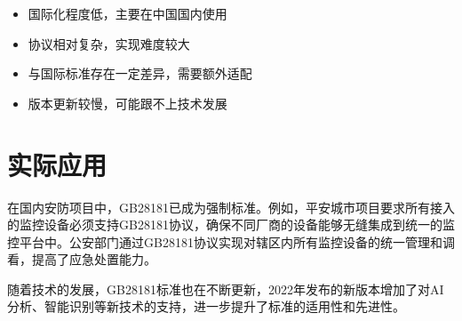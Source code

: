 \documentclass[12pt,UTF8]{ctexbook}
\begin{document}
\begin{itemize}
  \item 国际化程度低，主要在中国国内使用
  \item 协议相对复杂，实现难度较大
  \item 与国际标准存在一定差异，需要额外适配
  \item 版本更新较慢，可能跟不上技术发展
\end{itemize}

\chapter{实际应用}

在国内安防项目中，GB28181已成为强制标准。例如，平安城市项目要求所有接入的监控设备必须支持GB28181协议，确保不同厂商的设备能够无缝集成到统一的监控平台中。公安部门通过GB28181协议实现对辖区内所有监控设备的统一管理和调看，提高了应急处置能力。

随着技术的发展，GB28181标准也在不断更新，2022年发布的新版本增加了对AI分析、智能识别等新技术的支持，进一步提升了标准的适用性和先进性。

\backmatter
\end{document}
